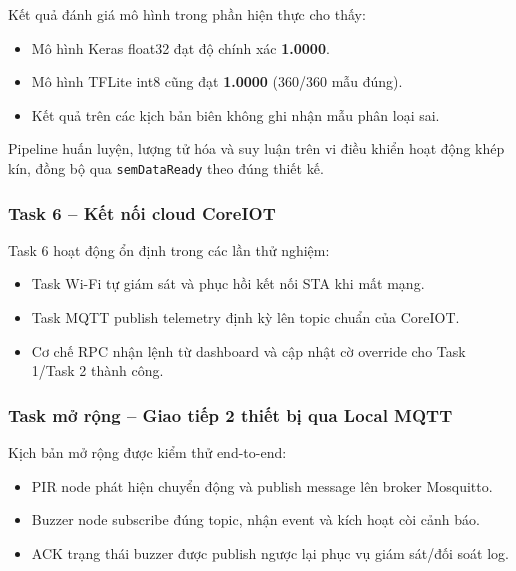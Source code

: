 Kết quả đánh giá mô hình trong phần hiện thực cho thấy:
\begin{itemize}
    \item Mô hình Keras float32 đạt độ chính xác \textbf{1.0000}.
    \item Mô hình TFLite int8 cũng đạt \textbf{1.0000} (360/360 mẫu đúng).
    \item Kết quả trên các kịch bản biên không ghi nhận mẫu phân loại sai.
\end{itemize}
Pipeline huấn luyện, lượng tử hóa và suy luận trên vi điều khiển hoạt động khép kín, đồng bộ qua \texttt{semDataReady} theo đúng thiết kế.

\subsubsection*{Task 6 -- Kết nối cloud CoreIOT}

Task 6 hoạt động ổn định trong các lần thử nghiệm:
\begin{itemize}
    \item Task Wi-Fi tự giám sát và phục hồi kết nối STA khi mất mạng.
    \item Task MQTT publish telemetry định kỳ lên topic chuẩn của CoreIOT.
    \item Cơ chế RPC nhận lệnh từ dashboard và cập nhật cờ override cho Task 1/Task 2 thành công.
\end{itemize}

\subsubsection*{Task mở rộng -- Giao tiếp 2 thiết bị qua Local MQTT}

Kịch bản mở rộng được kiểm thử end-to-end:
\begin{itemize}
    \item PIR node phát hiện chuyển động và publish message lên broker Mosquitto.
    \item Buzzer node subscribe đúng topic, nhận event và kích hoạt còi cảnh báo.
    \item ACK trạng thái buzzer được publish ngược lại phục vụ giám sát/đối soát log.
\end{itemize}

